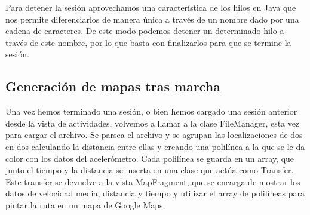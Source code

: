 Para detener la sesión aprovechamos una característica de los hilos en Java que nos permite diferenciarlos de manera única a través de un nombre dado por una cadena de caracteres. De este modo podemos detener un determinado hilo a través de este nombre, por lo que basta con finalizarlos para que se termine la sesión.

\subsection{Generación de mapas tras marcha}
\label{makereference6.2.4}

Una vez hemos terminado una sesión, o bien hemos cargado una sesión anterior desde la vista de actividades, volvemos a llamar a la clase FileManager, esta vez para cargar el archivo. Se parsea el archivo y se agrupan las localizaciones de dos en dos calculando la distancia entre ellas y creando una polilínea a la que se le da color con los datos del acelerómetro. Cada polilínea se guarda en un array, que junto el tiempo y la distancia se inserta en una clase que actúa como Transfer. Este transfer se devuelve a la vista MapFragment, que se encarga de mostrar los datos de velocidad media, distancia y tiempo y utilizar el array de polilíneas para pintar la ruta en un mapa de Google Maps.